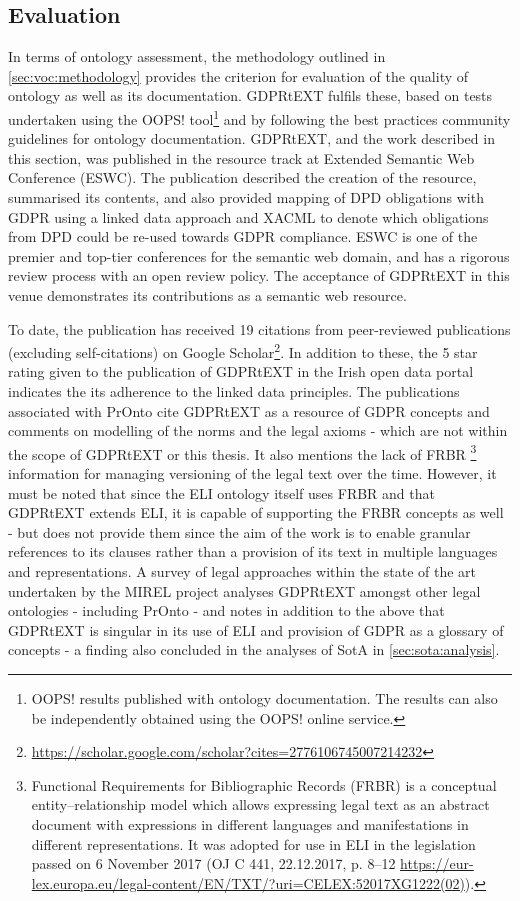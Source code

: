 \subsection{Evaluation}
In terms of ontology assessment, the methodology outlined in \autoref{sec:voc:methodology} provides the criterion for evaluation of the quality of ontology as well as its documentation. GDPRtEXT fulfils these, based on tests undertaken using the OOPS! tool\footnote{OOPS! results published with ontology documentation. The results can also be independently obtained using the OOPS! online service.} and by following the best practices community guidelines for ontology documentation.
GDPRtEXT, and the work described in this section, was published in the resource track at Extended Semantic Web Conference \cite{pandit_gdprtext_2018} (ESWC). The publication described the creation of the resource, summarised its contents, and also provided mapping of DPD obligations with GDPR using a linked data approach and XACML to denote which obligations from DPD could be re-used towards GDPR compliance. 
ESWC is one of the premier and top-tier conferences for the semantic web domain, and has a rigorous review process with an open review policy.
The acceptance of GDPRtEXT in this venue demonstrates its contributions as a semantic web resource.

To date, the publication has received 19 citations from peer-reviewed publications (excluding self-citations) on Google Scholar\footnote{\url{https://scholar.google.com/scholar?cites=2776106745007214232}}.
In addition to these, the 5 star rating given to the publication of GDPRtEXT in the Irish open data portal indicates the its adherence to the linked data principles.
The publications associated with PrOnto \cite{palmirani_pronto_2018,palmirani_pronto_2018-1} cite GDPRtEXT as a resource of GDPR concepts and comments on modelling of the norms and the legal axioms - which are not within the scope of GDPRtEXT or this thesis. It also mentions the lack of FRBR
\footnote{Functional Requirements for Bibliographic Records (FRBR) is a conceptual entity–relationship model which allows expressing legal text as an abstract document with expressions in different languages and manifestations in different representations. It was adopted for use in ELI in the legislation passed on 6 November 2017 (OJ C 441, 22.12.2017, p. 8–12 \url{https://eur-lex.europa.eu/legal-content/EN/TXT/?uri=CELEX:52017XG1222(02)}).}
information for managing versioning of the legal text over the time.
However, it must be noted that since the ELI ontology itself uses FRBR and that GDPRtEXT extends ELI, it is capable of supporting the FRBR concepts as well - but does not provide them since the aim of the work is to enable granular references to its clauses rather than a provision of its text in multiple languages and representations. 
A survey of legal approaches within the state of the art \cite{leone_taking_2019} undertaken by the MIREL project analyses GDPRtEXT amongst other legal ontologies - including PrOnto - and notes in addition to the above that GDPRtEXT is singular in its use of ELI and provision of GDPR as a glossary of concepts - a finding also concluded in the analyses of SotA in \autoref{sec:sota:analysis}.

